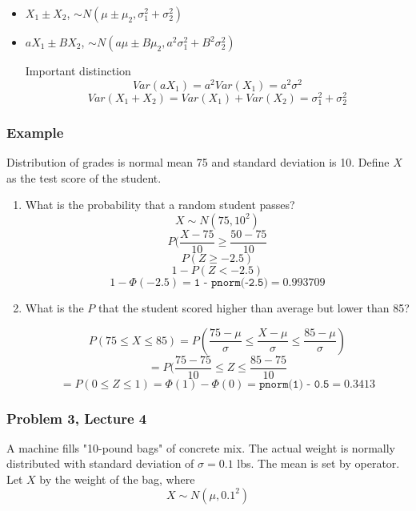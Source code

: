\documentclass{article}
\newcommand{\var}{\sigma^2}
\begin{document}
\begin{itemize}
\item $X_1 \pm X_2$, $ \sim N(\mu \pm \mu_2, \var_1 + \var_2)$
\item $aX_1 \pm BX_2$, $ \sim N(a\mu \pm B\mu_2, a^2\var_1 + B^2\var_2)$

Important distinction $$Var(aX_1) = a^2 Var(X_1) = a^2 \var$$ $$Var(X_1 + X_2) = Var(X_1) + Var(X_2) = \var_1 + \var_2 $$
\end{itemize}

\subsubsection*{Example}

Distribution of grades is normal mean 75 and standard deviation is 10. Define $X$ as the test score of the student.

\begin{enumerate}
\item What is the probability that a random student passes? $$X \sim N(75, 10^2) $$ $$ P( \frac{X-75}{10} \geq \frac{50-75}{10} $$ $$ P(Z \geq -2.5) $$ $$ 1- P(Z < -2.5) $$ $$ 1-\Phi(-2.5) = \texttt{1 - pnorm(-2.5)} = 0.993709 $$

\item What is the $P$ that the student scored higher than average but lower than 85?

$$ P(75 \leq X \leq 85) = P(\frac{75-\mu}{\sigma} \leq \frac{X-\mu}{\sigma} \leq \frac{85-\mu}{\sigma} ) $$
$$ = P(\frac{75-75}{10} \leq Z \leq \frac{85-75}{10}  $$ $$ = P(0 \leq Z \leq 1) = \Phi(1) - \Phi(0) = \texttt{pnorm(1) - 0.5} = 0.3413  $$

\end{enumerate}
\subsubsection*{Problem 3, Lecture 4}

A machine fills "10-pound bags" of concrete mix. The actual weight is normally distributed with standard deviation of $\sigma = 0.1$ lbs. The mean is set by operator. Let $X$ by the weight of the bag, where $$X \sim N(\mu, 0.1^2)$$
\end{document}
